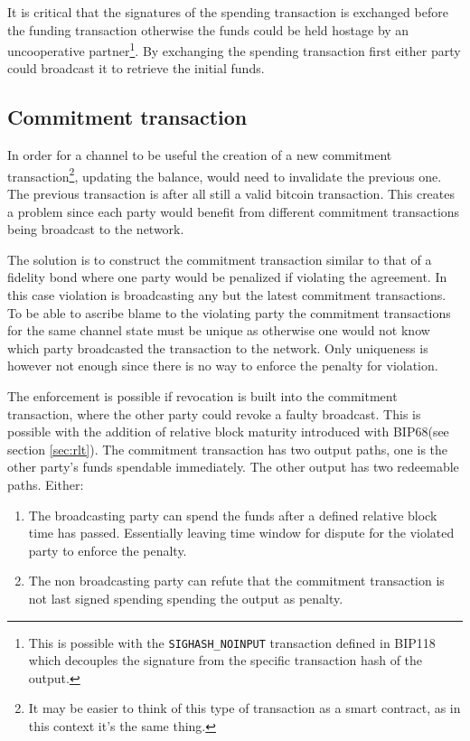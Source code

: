 It is critical that the signatures of the spending transaction is exchanged before the funding transaction otherwise the funds could be held hostage by an uncooperative partner\footnote{This is possible with the \texttt{SIGHASH\_NOINPUT} transaction defined in BIP118\cite{bip:0118:sighash:noinput} which decouples the signature from the specific transaction hash of the output.}. By exchanging the spending transaction first either party could broadcast it to retrieve the initial funds.

\subsection{Commitment transaction}

In order for a channel to be useful the creation of a new commitment transaction\footnote{It may be easier to think of this type of transaction as a smart contract, as in this context it's the same thing.}, updating the balance, would need to invalidate the previous one. The previous transaction is after all still a valid bitcoin transaction. This creates a problem since each party would benefit from different commitment transactions being broadcast to the network.

The solution is to construct the commitment transaction similar to that of a fidelity bond where one party would be penalized if violating the agreement. In this case violation is broadcasting any but the latest commitment transactions. To be able to ascribe blame to the violating party the commitment transactions for the same channel state must be unique as otherwise one would not know which party broadcasted the transaction to the network. Only uniqueness is however not enough since there is no way to enforce the penalty for violation. 

The enforcement is possible if revocation is built into the commitment transaction, where the other party could revoke a faulty broadcast. This is possible with the addition of relative block maturity introduced with BIP68\cite{bip:0068:sequence:lock:time}(see section \ref{sec:rlt}). The commitment transaction has two output paths, one is the other party's funds spendable immediately. The other output has two
redeemable paths. Either:

\begin{enumerate}
	\item The broadcasting party can spend the funds after a defined relative block time has passed. Essentially leaving time window for dispute for the violated party to enforce the penalty.
	\item The non broadcasting party can refute that the commitment transaction is not last signed spending spending the output as penalty.
\end{enumerate}

